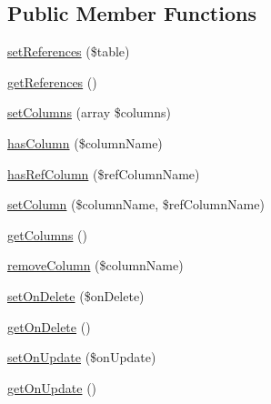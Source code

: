 \subsection*{Public Member Functions}
\begin{DoxyCompactItemize}
\item 
\hyperlink{classZendDbSchema__Db__Schema__Table__ForeignKey_a333403da95af60a2b4bd18952d1136f3}{set\-References} (\$table)
\item 
\hyperlink{classZendDbSchema__Db__Schema__Table__ForeignKey_a39c9a3febcb98b77692566eed81220c7}{get\-References} ()
\item 
\hyperlink{classZendDbSchema__Db__Schema__Table__ForeignKey_afb0c42af85a63c6347973ce79d2e7d80}{set\-Columns} (array \$columns)
\item 
\hyperlink{classZendDbSchema__Db__Schema__Table__ForeignKey_a275e68bc4f9eebe1af1ec77e6d0b731e}{has\-Column} (\$column\-Name)
\item 
\hyperlink{classZendDbSchema__Db__Schema__Table__ForeignKey_ab37a34d3b9b9913fddc255471eb79c00}{has\-Ref\-Column} (\$ref\-Column\-Name)
\item 
\hyperlink{classZendDbSchema__Db__Schema__Table__ForeignKey_acad90fc706fe3c4aa734b073fa551152}{set\-Column} (\$column\-Name, \$ref\-Column\-Name)
\item 
\hyperlink{classZendDbSchema__Db__Schema__Table__ForeignKey_a5cd45e4bc92ac5975975753e459b4c8c}{get\-Columns} ()
\item 
\hyperlink{classZendDbSchema__Db__Schema__Table__ForeignKey_a810c76bf8102391ec3d304647c369146}{remove\-Column} (\$column\-Name)
\item 
\hyperlink{classZendDbSchema__Db__Schema__Table__ForeignKey_a0c51ff09d6df59b68f8f5ff4ec1ed32d}{set\-On\-Delete} (\$on\-Delete)
\item 
\hyperlink{classZendDbSchema__Db__Schema__Table__ForeignKey_a83644a5b874f111e17dbf08ffa3ea803}{get\-On\-Delete} ()
\item 
\hyperlink{classZendDbSchema__Db__Schema__Table__ForeignKey_ae8ffd9c6bad60eaf6ef05cdd1f5c56fb}{set\-On\-Update} (\$on\-Update)
\item 
\hyperlink{classZendDbSchema__Db__Schema__Table__ForeignKey_afb55f45baab8357ce8c295e4d71bf700}{get\-On\-Update} ()
\end{DoxyCompactItemize}
